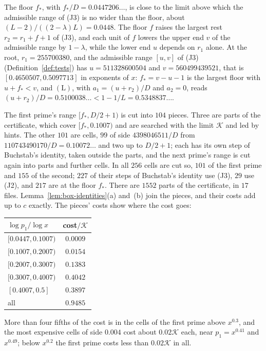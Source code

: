 \documentclass[11pt]{article}
\theoremstyle{definition}
\begin{document}
The floor $f_*$, with $f_*/D = 0.0447206\ldots$, is close to the limit above which the admissible range of (J3) is no
wider than the floor, about $(L - 2)/((2 - \lambda)L) = 0.0448$. The floor $f$ raises the largest rest $r_2 = r_1 + f
+ 1$ of (J3), and each unit of $f$ lowers the upper end $v$ of the admissible range by $1 - \lambda$, while the lower
end $u$ depends on $r_1$ alone. At the root, $r_1 = 255700380$, and the admissible range $[u, v]$ of (J3)
(Definition~\ref{def:tests}) has $u = 511328600504$ and $v = 560499439521$, that is $[0.4650507, 0.5097713]$ in
exponents of $x$: $f_* = v - u - 1$ is the largest floor with $u + f_* < v$, and $(\mathrm L)$, with $a_1 = (u +
r_2)/D$ and $a_2 = 0$, reads $(u + r_2)/D = 0.5100038\ldots < 1 - 1/L = 0.5348837\ldots$.

The first prime's range $[f_*, D/2 + 1)$ is cut into $104$ pieces. Three are parts of the certificate, which cover
$[f_*, 0.1007)$ and are searched with the limit $\mathcal K$ and led by hints. The other $101$ are cells, $99$ of side
$4398046511/D$ from $110743490170/D = 0.10072\ldots$ and two up to $D/2 + 1$; each has its own step of Buchstab's
identity, taken outside the parts, and the next prime's range is cut again into parts and further cells. In all $256$
cells are cut
so, $101$ of the first prime and $155$ of the second; $227$ of their steps of Buchstab's identity use (J3), $29$ use
(J2), and $217$ are at the floor $f_*$. There are $1552$ parts of the certificate, in $17$ files.
Lemma~\ref{lem:box-identities}(a) and~(b) join the pieces, and their costs add up to $c$ exactly. The pieces' costs
show where the cost goes:
\begin{center}
\small
\begin{tabular}{@{}lc@{}}
\toprule
$\log p_1/\log x$ & cost$/\mathcal K$ \\
\midrule
$[0.0447, 0.1007)$ & $0.0009$ \\
$[0.1007, 0.2007)$ & $0.0154$ \\
$[0.2007, 0.3007)$ & $0.1383$ \\
$[0.3007, 0.4007)$ & $0.4042$ \\
$[0.4007, 0.5]$ & $0.3897$ \\
\midrule
all & $0.9485$ \\
\bottomrule
\end{tabular}
\end{center}
More than four fifths of the cost is in the cells of the first prime above $x^{0.3}$, and the most expensive cells of
side
$0.004$ cost about $0.02\mathcal K$ each, near $p_1 = x^{0.41}$ and $x^{0.49}$; below $x^{0.2}$ the first prime costs
less than $0.02\mathcal K$ in all.
\end{document}
